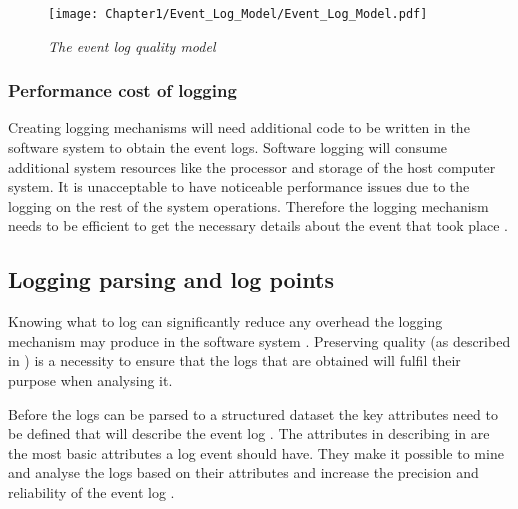 \begin{figure}[!htb] %
	\centering %
	\texttt{[image: Chapter1/Event\_Log\_Model/Event\_Log\_Model.pdf]}
	\caption[The event log quality model]
	{\textit{The event log quality model \cite{Kherbouche2017}}} \label{fig:EventQModel}
\end{figure}

\subsubsection{Performance cost of logging} 
Creating logging mechanisms will need additional code to be written in the software system to obtain the event logs. Software logging will consume additional system resources like the processor and storage of the host computer system. It is unacceptable to have noticeable performance issues due to the logging on the rest of the system operations. Therefore the logging mechanism needs to be efficient to get the necessary details about the event that took place \cite{Zhu2015, Zhu2019}. 

\clearpage

\subsection{Logging parsing and log points}\label{sec:ch1_loggignPoints}
Knowing what to log can significantly reduce any overhead the logging mechanism may produce in the software system \cite{Jia2018, Pecchia2015}. Preserving quality (as described in ) is a necessity to ensure that the logs that are obtained will fulfil their purpose when analysing it.\par Before the logs can be parsed to a structured dataset the key attributes need to be defined that will describe the event log \cite{Bekeneva2020}. The attributes in describing in  are the most basic attributes a log event should have. They make it possible to mine and analyse the logs based on their attributes and increase the precision and reliability of the event log \cite{Kherbouche2017}.


